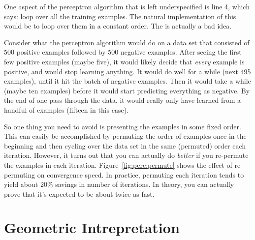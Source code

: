 One aspect of the perceptron algorithm that is left underspecified is
line 4, which says: loop over all the training examples.  The natural
implementation of this would be to loop over them in a constant
order.  The is actually a bad idea.

Consider what the perceptron algorithm would do on a data set that
consisted of $500$ positive examples followed by $500$ negative
examples.  After seeing the first few positive examples (maybe five),
it would likely decide that \emph{every} example is positive, and
would stop learning anything.  It would do well for a while (next 495
examples), until it hit the batch of negative examples.  Then it would
take a while (maybe ten examples) before it would start predicting
everything as negative.  By the end of one pass through the data, it
would really only have learned from a handful of examples (fifteen in
this case).



So one thing you need to avoid is presenting the examples in some
fixed order.  This can easily be accomplished by permuting the order
of examples once in the beginning and then cycling over the data set
in the same (permuted) order each iteration.  However, it turns out
that you can actually do \emph{better} if you re-permute the examples
in each iteration.  Figure~\ref{fig:perc:permute} shows the effect of
re-permuting on convergence speed.  In practice, permuting each
iteration tends to yield about $20\%$ savings in number of iterations.
In theory, you can actually prove that it's expected to be about twice
as fast.


\section{Geometric Intrepretation}

